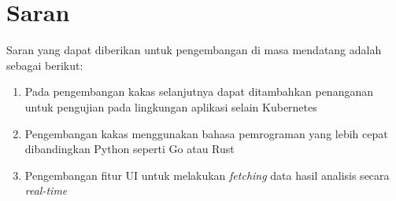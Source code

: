\section{Saran}
Saran yang dapat diberikan untuk pengembangan di masa mendatang adalah sebagai berikut:
\begin{enumerate}
	\item Pada pengembangan kakas selanjutnya dapat ditambahkan penanganan untuk pengujian pada lingkungan aplikasi selain Kubernetes
	\item Pengembangan kakas menggunakan bahasa pemrograman yang lebih cepat dibandingkan Python seperti Go atau Rust
	\item Pengembangan fitur UI untuk melakukan \textit{fetching} data hasil analisis secara \textit{real-time}
	

\end{enumerate}
